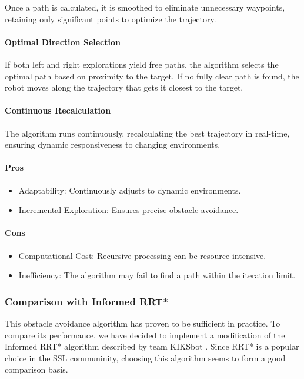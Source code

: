Once a path is calculated, it is smoothed to eliminate unnecessary waypoints, retaining only significant points to optimize the trajectory.

\paragraph{Optimal Direction Selection}

If both left and right explorations yield free paths, the algorithm selects the optimal path based on proximity to the target. If no fully clear path is found, the robot moves along the trajectory that gets it closest to the target.

\paragraph{Continuous Recalculation}

The algorithm runs continuously, recalculating the best trajectory in real-time, ensuring dynamic responsiveness to changing environments.


\paragraph{Pros}
\begin{itemize}
    \item Adaptability: Continuously adjusts to dynamic environments.
    \item Incremental Exploration: Ensures precise obstacle avoidance.
\end{itemize}

\paragraph{Cons}
\begin{itemize}
    \item Computational Cost: Recursive processing can be resource-intensive.
    \item Inefficiency: The algorithm may fail to find a path within the iteration limit.
\end{itemize}

\subsubsection{Comparison with Informed RRT*}
This obstacle avoidance algorithm has proven to be sufficient in practice. To compare its performance, we have decided to implement
a modification of the Informed RRT* algorithm described by team KIKSbot \cite{tdp_kiksbot_2023}. Since RRT* is a popular choice in the SSL communinity,
choosing this algorithm seems to form a good comparison basis.

